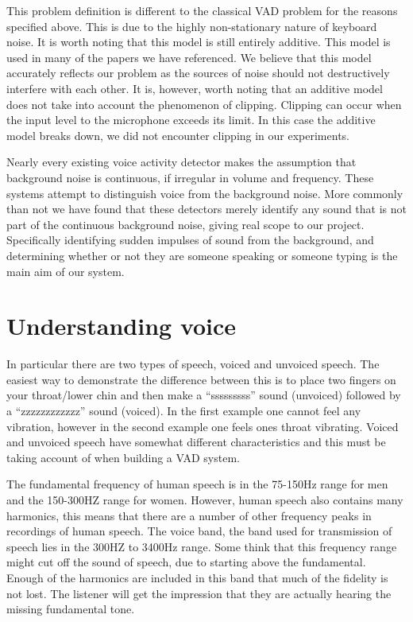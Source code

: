 \documentclass[ %
                    author={Sam Phippen},
                supervisor={Dr. Rafal Bogacz},
                     title={Real time voice activity detectors in noisy personal computing environments},
                  subtitle={},
                    degree={MEng},
                      year={2012} ]{thesis}
\begin{document}
This problem definition is different to the classical VAD problem for the
reasons specified above. This is due to the highly non-stationary nature of
keyboard noise. It is worth noting that this model is still entirely additive.
This model is used in many of the papers we have referenced. We believe that
this model accurately reflects our problem as the sources of noise should not
destructively interfere with each other. It is, however, worth noting that an
additive model does not take into account the phenomenon of clipping. Clipping
can occur when the input level to the microphone exceeds its limit. In this
case the additive model breaks down, we did not encounter clipping in our
experiments.

Nearly every existing voice activity detector makes the assumption that
background noise is continuous, if irregular in volume and frequency. These
systems attempt to distinguish voice from the background noise. More commonly
than not we have found that these detectors merely identify any sound that is
not part of the continuous background noise, giving real scope to our project.
Specifically identifying sudden impulses of sound from the background, and
determining whether or not they are someone speaking or someone typing is the
main aim of our system.

\section{Understanding voice}

In particular there are two types of speech, voiced and unvoiced speech. The
easiest way to demonstrate the difference between this is to place two fingers
on your throat/lower chin and then make a ``sssssssss'' sound (unvoiced) followed
by a ``zzzzzzzzzzzz'' sound (voiced). In the first example one cannot feel any
vibration, however in the second example one feels ones throat vibrating.
Voiced and unvoiced speech have somewhat different characteristics and this
must be taking account of when building a VAD system\cite{atal}.

The fundamental frequency of human speech is in the 75-150Hz range for men and
the 150-300HZ range for women\cite{Traunmüller}. However, human speech also
contains many harmonics, this means that there are a number of other frequency
peaks in recordings of human speech. The voice band, the band used for
transmission of speech lies in the 300HZ to 3400Hz range. Some think that this
frequency range might cut off the sound of speech, due to starting above the
fundamental. Enough of the harmonics are included in this band that much of the
fidelity is not lost. The listener will get the impression that they are
actually hearing the missing fundamental tone.
\end{document}
